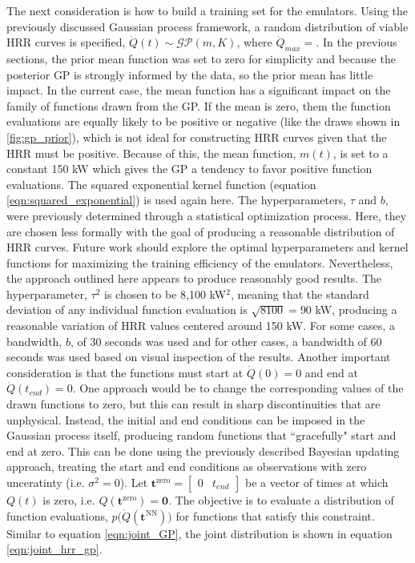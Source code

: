 \documentclass{article}
\begin{document}
The next consideration is how to build a training set for the emulators. Using the previously discussed Gaussian process framework, a random distribution of viable HRR curves is specified, $\dot{Q}(t)\sim \mathcal{GP}(m,K)$, where $\dot{Q}_{max} =$. In the previous sections, the prior mean function was set to zero for simplicity and because the posterior GP is strongly informed by the data, so the prior mean has little impact. In the current case, the mean function has a significant impact on the family of functions drawn from the GP. If the mean is zero, them the function evaluations are equally likely to be positive or negative (like the draws shown in \ref{fig:gp_prior}), which is not ideal for constructing HRR curves given that the HRR must be positive. Because of this, the mean function, $m(t)$, is set to  a constant 150 kW which gives the GP a tendency to favor positive function evaluations.  The squared exponential kernel function (equation \ref{eqn:squared_exponential}) is used again here. The hyperparameters, $\tau$ and $b$, were previously determined through a statistical optimization process. Here, they are chosen less formally with the goal of producing a reasonable distribution of HRR curves. Future work should explore the optimal hyperparameters and kernel functions for maximizing the training efficiency of the emulators. Nevertheless, the approach outlined here appears to produce reasonably good results. The hyperparameter, $\tau^2$ is chosen to be 8,100 kW$^{\text{2}}$, meaning that the standard deviation of any individual function evaluation is $\sqrt{8100} = 90$ kW, producing a reasonable variation of HRR values centered around 150 kW. For some cases, a bandwidth, $b$, of 30 seconds was used and for other cases, a bandwidth of 60 seconds was used based on visual inspection of the results. Another important consideration is that the functions must start at $\dot{Q}(0) = 0$ and end at $\dot{Q}(t_{end}) = 0$. One approach would be to change the corresponding values of the drawn functions to zero, but this can result in sharp discontinuities that are unphysical. Instead, the initial and end conditions can be imposed in the Gaussian process itself, producing random functions that ``gracefully" start and end at zero. This can be done using the previously described Bayesian updating approach, treating the start and end conditions as observations with zero unceratinty (i.e. $\sigma^2 = 0$). Let $\boldsymbol{t}^{\text{zero}} = \begin{bmatrix} 0 & t_{end}  \end{bmatrix}$ be a vector of times at which $Q(t)$ is zero, i.e. $Q(\boldsymbol{t}^{\text{zero}}) = \boldsymbol{0}$. The objective is to evaluate a distribution of function evaluations, $p\Big(\dot{Q}(\boldsymbol{t}^{\text{NN}})\Big)$ for functions that satisfy this constraint. Similar to equation \ref{eqn:joint_GP}, the joint distribution is shown in equation \ref{eqn:joint_hrr_gp}.
\end{document}
